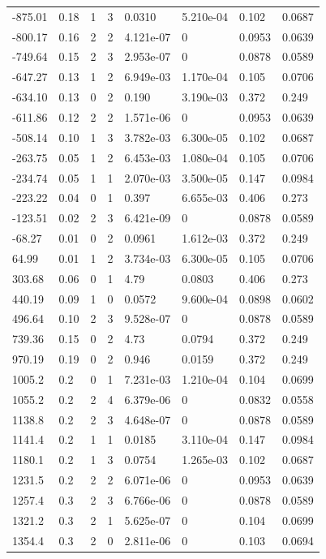 \documentclass[preview]{standalone}
\begin{document}
{{\begin{tabular}{L{1.2cm}C{1.2cm} C{0.3cm}C{0.5cm} C{1.4cm}C{1.4cm} C{1.4cm}C{1.4cm}}
  -875.01  &  0.18  & 1     &  3 &  0.0310  & 5.210e-04  & 0.102 &  0.0687   \\ 
  -800.17  &  0.16  & 2     &  2 &  4.121e-07  & 0  & 0.0953 &  0.0639   \\ 
  -749.64  &  0.15  & 2     &  3 &  2.953e-07  & 0  & 0.0878 &  0.0589   \\ 
  -647.27  &  0.13  & 1     &  2 &  6.949e-03  & 1.170e-04  & 0.105 &  0.0706   \\ 
  -634.10  &  0.13  & 0     &  2 &  0.190  & 3.190e-03  & 0.372 &  0.249   \\ 
  -611.86  &  0.12  & 2     &  2 &  1.571e-06  & 0  & 0.0953 &  0.0639   \\ 
  -508.14  &  0.10  & 1     &  3 &  3.782e-03  & 6.300e-05  & 0.102 &  0.0687   \\ 
  -263.75  &  0.05  & 1     &  2 &  6.453e-03  & 1.080e-04  & 0.105 &  0.0706   \\ 
  -234.74  &  0.05  & 1     &  1 &  2.070e-03  & 3.500e-05  & 0.147 &  0.0984   \\ 
  -223.22  &  0.04  & 0     &  1 &  0.397  & 6.655e-03  & 0.406 &  0.273   \\ 
  -123.51  &  0.02  & 2     &  3 &  6.421e-09  & 0  & 0.0878 &  0.0589   \\ 
  -68.27  &  0.01  & 0     &  2 &  0.0961  & 1.612e-03  & 0.372 &  0.249   \\ 
  64.99  &  0.01  & 1     &  2 &  3.734e-03  & 6.300e-05  & 0.105 &  0.0706   \\ 
  303.68  &  0.06  & 0     &  1 &  4.79  & 0.0803  & 0.406 &  0.273   \\ 
  440.19  &  0.09  & 1     &  0 &  0.0572  & 9.600e-04  & 0.0898 &  0.0602   \\ 
  496.64  &  0.10  & 2     &  3 &  9.528e-07  & 0  & 0.0878 &  0.0589   \\ 
  739.36  &  0.15  & 0     &  2 &  4.73  & 0.0794  & 0.372 &  0.249   \\ 
  970.19  &  0.19  & 0     &  2 &  0.946  & 0.0159  & 0.372 &  0.249   \\ 
  1005.2  &   0.2  & 0     &  1 &  7.231e-03  & 1.210e-04  & 0.104 &  0.0699   \\ 
  1055.2  &   0.2  & 2     &  4 &  6.379e-06  & 0  & 0.0832 &  0.0558   \\ 
  1138.8  &   0.2  & 2     &  3 &  4.648e-07  & 0  & 0.0878 &  0.0589   \\ 
  1141.4  &   0.2  & 1     &  1 &  0.0185  & 3.110e-04  & 0.147 &  0.0984   \\ 
  1180.1  &   0.2  & 1     &  3 &  0.0754  & 1.265e-03  & 0.102 &  0.0687   \\ 
  1231.5  &   0.2  & 2     &  2 &  6.071e-06  & 0  & 0.0953 &  0.0639   \\ 
  1257.4  &   0.3  & 2     &  3 &  6.766e-06  & 0  & 0.0878 &  0.0589   \\ 
  1321.2  &   0.3  & 2     &  1 &  5.625e-07  & 0  & 0.104 &  0.0699   \\ 
  1354.4  &   0.3  & 2     &  0 &  2.811e-06  & 0  & 0.103 &  0.0694   \\ 
\hline 
\end{tabular} 

}}
\end{document}
